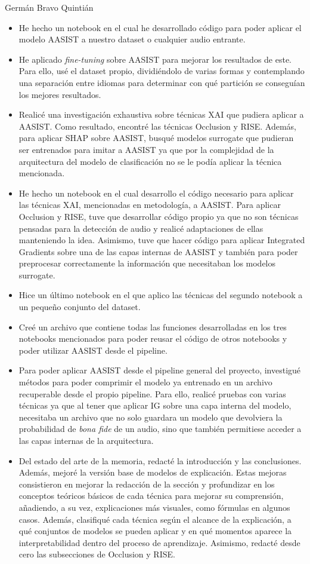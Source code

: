 \begin{contribucion}{Germán Bravo Quintián}
\begin{itemize}
    \item He hecho un notebook en el cual he desarrollado código para poder aplicar el modelo AASIST a nuestro dataset o cualquier audio entrante.
    \item He aplicado \textit{fine-tuning} sobre AASIST para mejorar los resultados de este. Para ello, usé el dataset propio, dividiéndolo de varias formas y contemplando una separación entre idiomas para determinar con qué partición se conseguían los mejores resultados.
    \item Realicé una investigación exhaustiva sobre técnicas XAI que pudiera aplicar a AASIST. Como resultado, encontré las técnicas Occlusion y RISE. Además, para aplicar SHAP sobre AASIST, busqué modelos surrogate que pudieran ser entrenados para imitar a AASIST ya que por la complejidad de la arquitectura del modelo de clasificación no se le podía aplicar la técnica mencionada.
    \item He hecho un notebook en el cual desarrollo el código necesario para aplicar las técnicas XAI, mencionadas en metodología, a AASIST. Para aplicar Occlusion y RISE, tuve que desarrollar código propio ya que no son técnicas pensadas para la detección de audio y realicé adaptaciones de ellas manteniendo la idea. Asimismo, tuve que hacer código para aplicar Integrated Gradients sobre una de las capas internas de AASIST y también para poder preprocesar correctamente la información que necesitaban los modelos surrogate.
    \item Hice un último notebook en el que aplico las técnicas del segundo notebook a un pequeño conjunto del dataset.
    \item Creé un archivo que contiene todas las funciones desarrolladas en los tres notebooks mencionados para poder reusar el código de otros notebooks y poder utilizar AASIST desde el pipeline.
    \item Para poder aplicar AASIST desde el pipeline general del proyecto, investigué métodos para poder comprimir el modelo ya entrenado en un archivo recuperable desde el propio pipeline. Para ello, realicé pruebas con varias técnicas ya que al tener que aplicar IG sobre una capa interna del modelo, necesitaba un archivo que no solo guardara un modelo que devolviera la probabilidad de \textit{bona fide} de un audio, sino que también permitiese acceder a las capas internas de la arquitectura.
    \item Del estado del arte de la memoria, redacté la introducción y las conclusiones. Además, mejoré la versión base de modelos de explicación. Estas mejoras consistieron en mejorar la redacción de la sección y profundizar en los conceptos teóricos básicos de cada técnica para mejorar su comprensión, añadiendo, a su vez, explicaciones más visuales, como fórmulas en algunos casos. Además, clasifiqué cada técnica según el alcance de la explicación, a qué conjuntos de modelos se pueden aplicar y en qué momentos aparece la interpretabilidad dentro del proceso de aprendizaje. Asimismo, redacté desde cero las subsecciones de Occlusion y RISE.

\end{itemize}
\end{contribucion}

